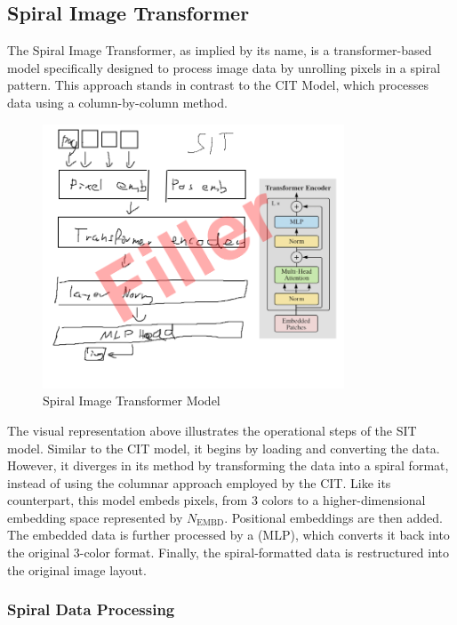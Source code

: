 

\subsection{Spiral Image Transformer}

    The Spiral Image Transformer, as implied by its name, is a transformer-based model specifically designed to process image data by unrolling pixels in a spiral pattern. This approach stands in contrast to the CIT Model, which processes data using a column-by-column method.

    \begin{figure}[H]
        \centering
        \includegraphics[width=0.8\textwidth]{imgs/SITModel.png}
        \caption{Spiral Image Transformer Model}
        \label{fig:SpiralImageTransformer}
    \end{figure}

    The visual representation above illustrates the operational steps of the SIT model. Similar to the CIT model, it begins by loading and converting the data. However, it diverges in its method by transforming the data into a spiral format, instead of using the columnar approach employed by the CIT. Like its counterpart, this model embeds pixels, from 3 colors to a higher-dimensional embedding space represented by \(N_{\text{EMBD}}\). Positional embeddings are then added. The embedded data is further processed by a (MLP), which converts it back into the original 3-color format. Finally, the spiral-formatted data is restructured into the original image layout.

    \subsubsection{Spiral Data Processing}

